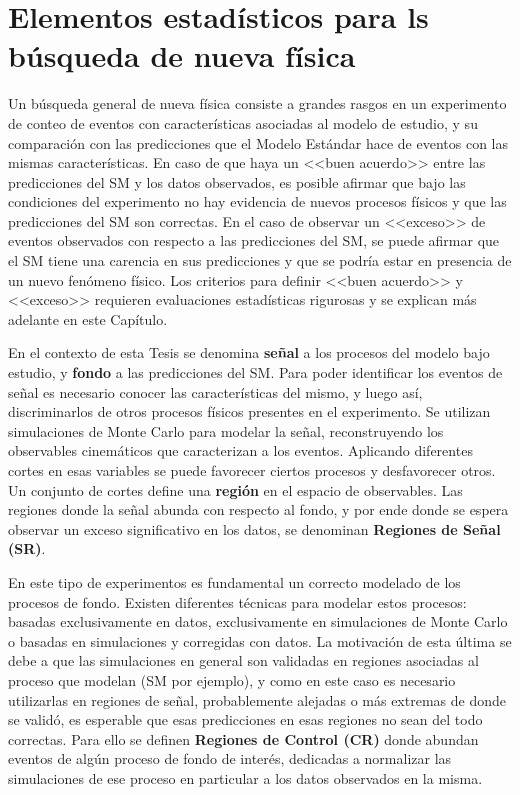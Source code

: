 \chapter{Elementos estadísticos para ls búsqueda de nueva física}

Un búsqueda general de nueva física consiste a grandes rasgos en un experimento de conteo de eventos con características asociadas al modelo de estudio, y su comparación con las predicciones que el Modelo Estándar hace de eventos con las mismas características. En caso de que haya un <<buen acuerdo>> entre las predicciones del SM y los datos observados, es posible afirmar que bajo las condiciones del experimento no hay evidencia de nuevos procesos físicos y que las predicciones del SM son correctas. En el caso de observar un <<exceso>>  de eventos observados con respecto a las predicciones del SM, se puede afirmar que el SM tiene una carencia en sus predicciones y que se podría estar en presencia de un nuevo fenómeno físico. Los criterios para definir <<buen acuerdo>> y <<exceso>> requieren evaluaciones estadísticas rigurosas y se explican más adelante en este Capítulo. 

En el contexto de esta Tesis se denomina \textbf{señal} a los procesos del modelo bajo estudio, y \textbf{fondo} a las predicciones del SM. Para poder identificar los eventos de señal es necesario conocer las características del mismo, y luego así, discriminarlos de otros procesos físicos presentes en el experimento. Se utilizan simulaciones de Monte Carlo para modelar la señal, reconstruyendo los observables cinemáticos que caracterizan a los eventos. Aplicando diferentes cortes en esas variables se puede favorecer ciertos procesos y desfavorecer otros. Un conjunto de cortes define una \textbf{región} en el espacio de observables. Las regiones donde la señal abunda con respecto al fondo, y por ende donde se espera observar un exceso significativo en los datos, se denominan \textbf{Regiones de Señal (SR)}.

En este tipo de experimentos es fundamental un correcto modelado de los procesos de fondo. Existen diferentes técnicas para modelar estos procesos: basadas exclusivamente en datos, exclusivamente en simulaciones de Monte Carlo o basadas en simulaciones y corregidas con datos. La motivación de esta última se debe a que las simulaciones en general son validadas en regiones asociadas al proceso que modelan (SM por ejemplo), y como en este caso es necesario utilizarlas en regiones de señal, probablemente alejadas o más extremas de donde se validó, es esperable que esas predicciones en esas regiones no sean del todo correctas. Para ello se definen \textbf{Regiones de Control (CR)} donde abundan eventos de algún proceso de fondo de interés, dedicadas a normalizar las simulaciones de ese proceso en particular a los datos observados en la misma.

